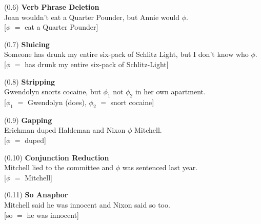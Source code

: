 \documentclass{article}
\begin{document}
\begin{enumerate*}
\item[(0.6)] \textbf{Verb Phrase Deletion}\\
Joan wouldn't eat a Quarter Pounder, but Annie would ${\phi}$.\\
{}[${\phi}$ ${=}$ eat a Quarter Pounder]
\end{enumerate*}

\begin{enumerate*}
\item[(0.7)] \textbf{Sluicing}\\
Someone has drunk my entire six-pack of Schlitz Light, but I
don't know who ${\phi}$.\\
{}[${\phi}$ ${=}$ has drunk my entire six-pack of Schlitz-Light]
\end{enumerate*}

\begin{enumerate*}
\item[(0.8)] \textbf{Stripping}\\
Gwendolyn snorts cocaine, but ${\phi_{\textrm{1}}}$ not ${\phi_{\textrm{2}}}$ in her own
apartment.\\
{}[${\phi_{\textrm{1}}}$ ${=}$ Gwendolyn (does), ${\phi_{\textrm{2}}}$ ${=}$ snort cocaine]
\end{enumerate*}

\begin{enumerate*}
\item[(0.9)] \textbf{Gapping}\\
Erichman duped Haldeman and Nixon ${\phi}$ Mitchell.\\
{}[${\phi}$ ${=}$ duped]
\end{enumerate*}

\begin{enumerate*}
\item[(0.10)] \textbf{Conjunction Reduction}\\
Mitchell lied to the committee and ${\phi}$ was sentenced last
year.\\
{}[${\phi}$ ${=}$ Mitchell]
\end{enumerate*}

\begin{enumerate*}
\item[(0.11)] \textbf{So Anaphor}\\
Mitchell said he was innocent and Nixon said so too.\\
{}[so ${=}$ he was innocent]
\end{enumerate*}
\end{document}
